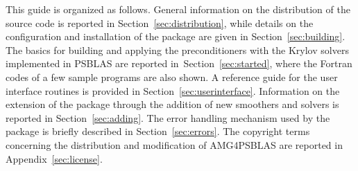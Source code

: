 This guide is organized as follows. General information on the
distribution of the source code is reported in
Section~\ref{sec:distribution}, while details on the configuration and
installation of the package are given in
Section~\ref{sec:building}. The basics for building and applying the
preconditioners with the Krylov solvers implemented in PSBLAS are
reported in~Section~\ref{sec:started}, where the Fortran codes of a
few sample programs are also shown. A reference guide for the user
interface routines is provided in
Section~\ref{sec:userinterface}. Information on the extension of the
package through the addition of new smoothers and solvers is reported
in Section~\ref{sec:adding}. The error handling mechanism used by the
package is briefly described in Section~\ref{sec:errors}. The
copyright terms concerning the distribution and modification of
AMG4PSBLAS are reported in Appendix~\ref{sec:license}. 

